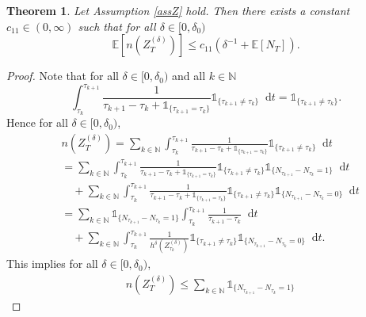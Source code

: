 \documentclass[11pt,a4paper]{article}
\numberwithin{equation}{section}
\newtheorem{theorem}{Theorem}[section]
\theoremstyle{definition}
\newcommand{\E}{{\mathbb{E}}}
\newcommand{\N}{{\mathbb{N}}}
\newcommand{\diff}{\mathop{}\!\mathrm{d}}
\begin{document}
\begin{theorem}\label{thm:cost}
    Let Assumption \ref{assZ} hold. Then there exists a constant $c_{11}\in(0,\infty)$ such that for all $\delta\in[0,\delta_0)$
    \begin{equation}
        \E[n(Z^{(\delta)}_T)]\leq c_{11}(\delta^{-1}+\E[N_T]).
    \end{equation}
\end{theorem}

\begin{proof}
    Note that for all $\delta\in[0,\delta_0)$ and all $k\in\N$
    \begin{equation}
        \int_{\tau_k}^{\tau_{k+1}} \frac{1}{\tau_{k+1}-\tau_k + \mathds{1}_{\{\tau_{k+1}=\tau_k\}}} \mathds{1}_{\{\tau_{k+1}\neq\tau_k\}} \diff t = \mathds{1}_{\{\tau_{k+1}\neq\tau_k\}}.
    \end{equation}
    Hence for all $\delta\in[0,\delta_0)$,
    \begin{equation}
        \begin{aligned}
            &n(Z^{(\delta)}_T) = \sum_{k\in\N} \int_{\tau_k}^{\tau_{k+1}} \frac{1}{\tau_{k+1}-\tau_k+ \mathds{1}_{\{\tau_{k+1}=\tau_k\}}} \mathds{1}_{\{\tau_{k+1}\neq\tau_k\}} \diff t\\
            &= \sum_{k\in\N} \int_{\tau_k}^{\tau_{k+1}} \frac{1}{\tau_{k+1}-\tau_k+ \mathds{1}_{\{\tau_{k+1}=\tau_k\}}} \mathds{1}_{\{\tau_{k+1}\neq\tau_k\}} \mathds{1}_{\{N_{\tau_{k+1}}-N_{\tau_k} = 1\}}\diff t\\
            &\quad + \sum_{k\in\N} \int_{\tau_k}^{\tau_{k+1}} \frac{1}{\tau_{k+1}-\tau_k+ \mathds{1}_{\{\tau_{k+1}=\tau_k\}}} \mathds{1}_{\{\tau_{k+1}\neq\tau_k\}} \mathds{1}_{\{N_{\tau_{k+1}}-N_{\tau_k} = 0\}}\diff t\\
            &= \sum_{k\in\N} \mathds{1}_{\{N_{\tau_{k+1}}-N_{\tau_k} = 1\}} \int_{\tau_k}^{\tau_{k+1}} \frac{1}{\tau_{k+1}-\tau_k} \diff t\\
            &\quad + \sum_{k\in\N} \int_{\tau_k}^{\tau_{k+1}} \frac{1}{h^\delta(Z^{(\delta)}_{\tau_k})} \mathds{1}_{\{\tau_{k+1}\neq\tau_k\}} \mathds{1}_{\{N_{\tau_{k+1}}-N_{\tau_k} = 0\}}\diff t.
        \end{aligned}
    \end{equation}
    This implies for all $\delta\in[0,\delta_0)$,
    \begin{equation}\label{eq:Cost1}
        \begin{aligned}
            &n(Z^{(\delta)}_T) \leq  \sum_{k\in\N} \mathds{1}_{\{N_{\tau_{k+1}}-N_{\tau_k} = 1\}} 

\end{aligned}
\end{equation}
\end{proof}
\end{document}
